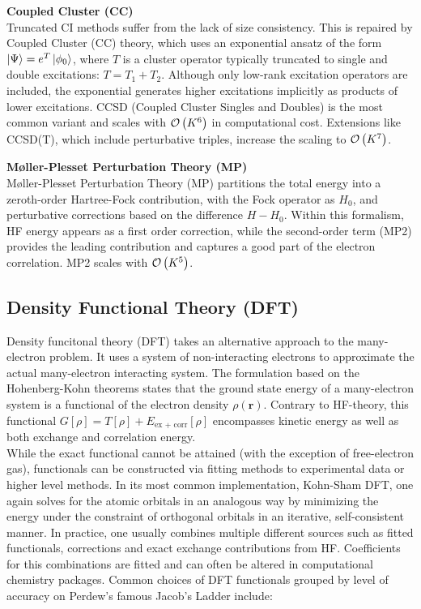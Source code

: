 \textbf{Coupled Cluster (CC)}\\
Truncated CI methods suffer from the lack of size consistency. This is repaired by Coupled Cluster (CC) theory, which uses an exponential ansatz of the form $\ket{\Psi} = e^T \ket{\phi_0}$, where $T$ is a cluster operator typically truncated to single and double excitations: $T = T_1 + T_2$. Although only low-rank excitation operators are included, the exponential generates higher excitations implicitly as products of lower excitations. CCSD (Coupled Cluster Singles and Doubles) is the most common variant and scales with $\mathcal{O}\left(K^6\right)$ in computational cost. Extensions like CCSD(T), which include perturbative triples, increase the scaling to $\mathcal{O}\left(K^7\right)$.

\textbf{Møller-Plesset Perturbation Theory (MP)}\\
Møller-Plesset Perturbation Theory (MP) partitions the total energy into a zeroth-order Hartree-Fock contribution, with the Fock operator as $H_0$, and perturbative corrections based on the difference $H - H_0$. Within this formalism, HF energy appears as a first order correction, while the second-order term (MP2) provides the leading contribution and captures a good part of the electron correlation. MP2 scales with $\mathcal{O}\left(K^5\right)$. 

\subsection{Density Functional Theory (DFT)}
\label{subsec:background_dft}
Density funcitonal theory (DFT) takes an alternative approach to the many-electron problem. It uses a system of non-interacting electrons to approximate the actual many-electron interacting system. The formulation based on the Hohenberg-Kohn theorems \parencite{ref:hohenberg_kohn1964} states that the ground state energy of a many-electron system is a functional of the electron density $\rho(\mathbf{r})$. Contrary to HF-theory, this functional $G[\rho] = T[\rho] + E_{\text{ex + corr}}[\rho]$ encompasses kinetic energy as well as both exchange and correlation energy. \parencite{ref:kohn_sham_1965}\\
While the exact functional cannot be attained (with the exception of free-electron gas), functionals can be constructed via fitting methods to experimental data or higher level methods. 
In its most common implementation, Kohn-Sham DFT, one again solves for the atomic orbitals in an analogous way by minimizing the energy under the constraint of orthogonal orbitals in an iterative, self-consistent manner. In practice, one usually combines multiple different sources such as fitted functionals, corrections and exact exchange contributions from HF. Coefficients for this combinations are fitted and can often be altered in computational chemistry packages. 
Common choices of DFT functionals grouped by level of accuracy on Perdew's famous Jacob's Ladder \parencite{ref:perdew_jacobs_ladder} include:

